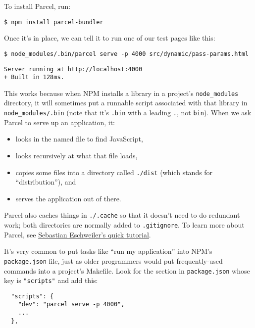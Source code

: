 To install Parcel, run:

\begin{verbatim}
$ npm install parcel-bundler
\end{verbatim}

Once it's in place,
we can tell it to run one of our test pages like this:

\begin{verbatim}
$ node_modules/.bin/parcel serve -p 4000 src/dynamic/pass-params.html
\end{verbatim}

\begin{verbatim}
Server running at http://localhost:4000
+ Built in 128ms.
\end{verbatim}

This works because when NPM installs a library in a project's \texttt{node\_modules} directory,
it will sometimes put a runnable script associated with that library in \texttt{node\_modules/.bin}
(note that it's \texttt{.bin} with a leading \texttt{.}, not \texttt{bin}).
When we ask Parcel to serve up an application, it:

\begin{itemize}
\item
  looks in the named file to find JavaScript,
\item
  looks recursively at what that file loads,
\item
  copies some files into a directory called \texttt{./dist} (which stands for ``distribution''), and
\item
  serves the application out of there.
\end{itemize}

Parcel also caches things in \texttt{./.cache} so that it doesn't need to do redundant work;
both directories are normally added to \texttt{.gitignore}.
To learn more about Parcel, see \href{https://medium.com/codingthesmartway-com-blog/getting-started-with-parcel-197eb85a2c8c}{Sebastian Eschweiler's quick tutorial}.

It's very common to put tasks like ``run my application'' into NPM's \texttt{package.json} file,
just as older programmers would put frequently-used commands into a project's Makefile.
Look for the section in \texttt{package.json} whose key is \texttt{"scripts"} and add this:

\begin{verbatim}
  "scripts": {
    "dev": "parcel serve -p 4000",
    ...
  },
\end{verbatim}

